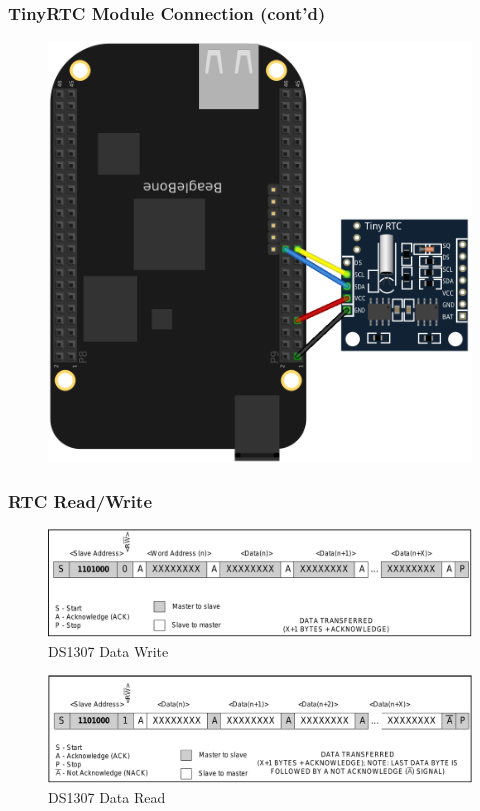 \documentclass[aspectratio=169,usenames,dvipsnames]{beamer}
\newcounter{cont}
\begin{document}
\begin{frame}
  \frametitle{TinyRTC Module Connection (cont'd)}
  \begin{figure}
    \centering
    \includegraphics[scale=0.7]{images/bbb-rtc_bb.png}
  \end{figure}
  \vspace*{-12mm}
\end{frame}

\begin{frame}
  \frametitle{RTC Read/Write}
  \vspace*{-2mm}
  \begin{figure}
    \centering
    \includegraphics[scale=0.35]{images/ds1307-write.png}
    \caption{DS1307 Data Write}
  \end{figure}
  \vspace*{-5mm}
  \begin{figure}
    \centering
    \includegraphics[scale=0.35]{images/ds1307-read.png}
    \caption{DS1307 Data Read}
  \end{figure}
  \vspace*{-12mm}
\end{frame}
\end{document}

